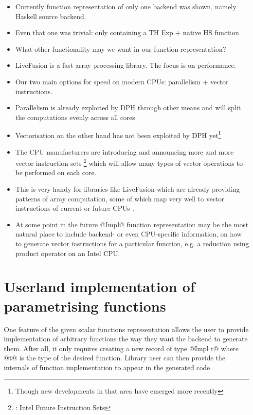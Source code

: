 \documentclass[preamble.tex]{subfiles}
\begin{document}
\begin{itemize}
\item Currently function representation of only one backend was shown, namely Haskell source backend.
\item Even that one was trivial: only containing a TH Exp + native HS function
\item What other functionality may we want in our function representation?
\item LiveFusion is a fast array processing library. The focus is on performance.
\item Our two main options for speed on modern CPUs: parallelism + vector instructions.
\item Parallelism is already exploited by DPH through other means and will split the computations evenly across all cores
\item Vectorisation on the other hand has not been exploited by DPH yet\footnote{Though new developments in that area have emerged more recently }
\item The CPU manufacturers are introducing and announcing more and more vector instruction sets \footnote{: Intel Future Instruction Sets} which will allow many types of vector operations to be performed on each core.
\item This is very handy for libraries like LiveFusion which are already providing patterns of array computation, some of which map very well to vector instructions of current or future CPUs .
\item At some point in the future @Impl@ function representation may be the most natural place to include backend- or even CPU-specific information, on how to generate vector instructions for a particular function, e.g. a reduction using product operator on an Intel CPU.
\end{itemize}

\section{Userland implementation of parametrising functions}

One feature of the given scalar functions representation allows the user to provide implementation of arbitrary functions the way they want the backend to generate them. After all, it only requires creating a new record of type @Impl t@ where @t@ is the type of the desired function. Library user can then provide the internals of function implementation to appear in the generated code.
\end{document}
